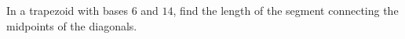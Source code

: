 In a trapezoid with bases $6$ and $14$, find the length of the segment connecting the midpoints of the diagonals.
